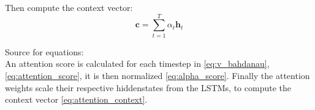 \documentclass{article}
\begin{document}
Then compute the context vector:
\begin{equation}
    \mathbf{c} = \sum_{t=1}^{T} \alpha_t \mathbf{h}_t \label{eq:attention_context}
\end{equation}

Source for equations: \cite{cristina_2023_bahdanau}
\\[2em]
An attention score is calculated for each timestep in \eqref{eq:v_bahdanau}, 
\eqref{eq:attention_score}, it is then normalized \eqref{eq:alpha_score}. 
Finally the attention weights scale their respective hiddenstates from the 
LSTMs, to compute the context vector \eqref{eq:attention_context}.



\newpage
\printbibliography[heading=bibintoc]
\end{document}
